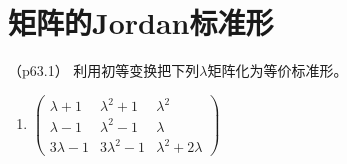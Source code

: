 \documentclass[12pt, a4paper, oneside, UTF8]{ctexbook}
\begin{document}
\else
\fi

\chapter{矩阵的Jordan标准形}
\begin{question}（p63.1）
利用初等变换把下列$\lambda$矩阵化为等价标准形。
\begin{enumerate}[label=(\arabic*)]
    \item $\begin{pmatrix}
        \lambda+1 & \lambda^2+1 &\lambda^2 \\
        \lambda-1 & \lambda^2-1 & \lambda \\
        3\lambda-1 & 3\lambda^2-1 & \lambda^2+2\lambda 
    \end{pmatrix}$
\end{enumerate}
\end{question}
\end{document}

